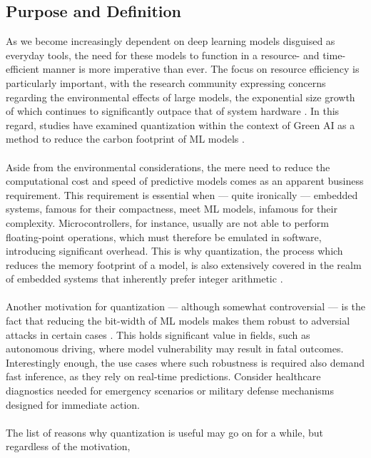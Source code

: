 \subsection{Purpose and Definition}
\label{subsec:purposeanddefinition}
As we become increasingly dependent on deep learning models disguised as everyday tools, 
the need for these models to function in a resource- and time-efficient manner is more imperative than ever. 
The focus on resource efficiency is particularly important, 
with the research community expressing concerns regarding the environmental effects of large models, 
the exponential size growth of which continues to significantly outpace that of system hardware \cite{DBLP:journals/corr/abs-2111-00364}. 
In this regard, studies have examined quantization within the context of Green AI as a method to reduce the carbon footprint of
ML models \cite{DBLP:journals/csi/RegueroMV25}.
\\
\\
Aside from the environmental considerations, the mere need to reduce 
the computational cost and speed of predictive models
comes as an apparent business requirement. 
This requirement is essential when — quite ironically — embedded systems, famous for their compactness, meet 
ML models, infamous for their complexity. Microcontrollers, for instance, 
usually are not able to perform floating-point operations, which must therefore be emulated in software, 
introducing significant overhead. This is why quantization, the process which reduces the memory footprint of a model,
is also extensively covered in the realm of embedded systems that 
inherently prefer integer arithmetic \cite{DBLP:conf/codit/KhalifaM24}\cite{DBLP:journals/corr/abs-2105-13331}.
\\
\\
Another motivation for quantization — although somewhat controversial — is the fact that reducing the bit-width of
ML models makes them robust to adversial attacks in certain cases \cite{DBLP:journals/corr/abs-2404-05639}.
This holds significant value in fields, such as autonomous driving,
where model vulnerability may result in fatal outcomes.
Interestingly enough, the use cases where such robustness is required also demand fast inference, 
as they rely on real-time predictions. Consider healthcare diagnostics needed for emergency scenarios 
or military defense mechanisms designed for immediate action.
\\
\\
The list of reasons why quantization is useful may go on for a while, but regardless of the motivation,

